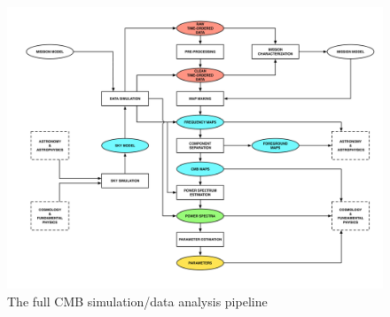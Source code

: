 \begin{figure}[htbp]
\centering
\includegraphics[width=1\textwidth]{Analysis/simda}
\caption{The full CMB simulation/data analysis pipeline}
\label{default}

\end{figure}

\newpage



\newpage



\newpage



\newpage



\newpage



\newpage

%



